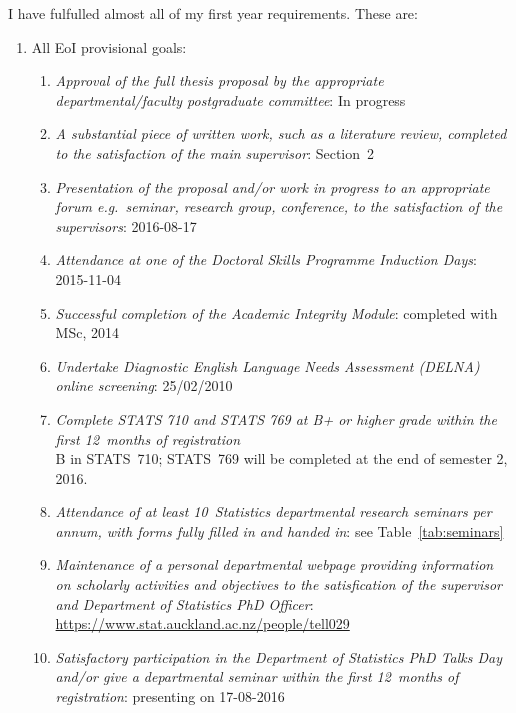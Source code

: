 \documentclass[12pt,a4paper]{article}
\begin{document}
I have fulfulled almost all of my first year requirements.
These are:
\begin{enumerate}

\item
All EoI provisional goals:
\begin{enumerate}

\item
\textit{Approval of the full thesis proposal by the appropriate departmental/faculty postgraduate
committee}:
In progress

\item
\textit{A substantial piece of written work, such as a literature review, completed to the
satisfaction of the main supervisor}: Section~2


\item
\textit{Presentation of the proposal and/or work in progress to an appropriate forum e.g.\ seminar,
research group, conference, to the satisfaction of the supervisors}:
2016-08-17

\item
\textit{Attendance at one of the Doctoral Skills Programme
Induction Days}:
2015-11-04

\item
\textit{Successful completion of the Academic Integrity Module}:
completed with MSc, 2014

\item
\textit{Undertake Diagnostic English Language Needs Assessment (DELNA) online screening}:
25/02/2010

\item
\textit{Complete STATS 710 and STATS 769 at B+ or higher grade within the first
12~months of registration}\\
B in STATS~710; STATS~769 will be completed at the end of semester 2, 2016.

\item
\textit{Attendance of at least 10~Statistics departmental research seminars per annum,
with forms fully filled in and handed in}:
see Table~\ref{tab:seminars}

\item
\textit{Maintenance of a personal departmental webpage providing information on scholarly
activities and objectives to the satisfication of the supervisor and Department of Statistics
PhD Officer}:
\url{https://www.stat.auckland.ac.nz/people/tell029}

\item
\textit{Satisfactory participation in the Department of Statistics PhD Talks Day and/or give
a departmental seminar within the first 12~months of registration}:
presenting on 17-08-2016



\end{enumerate}
\end{enumerate}
\end{document}
